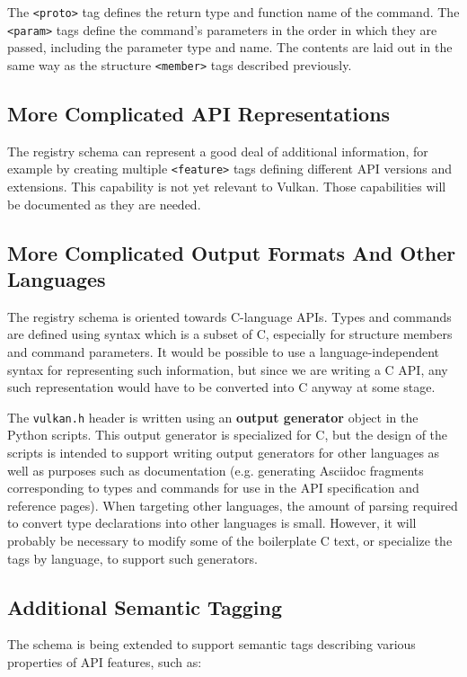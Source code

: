\documentclass{article}
\def\code#1{{\tt #1}}
\def\tag#1{{\tt <#1>\index{<#1>}}}
\begin{document}
The \tag{proto} tag defines the return type and function name of the
command. The \tag{param} tags define the command's parameters in the order
in which they are passed, including the parameter type and name. The contents
are laid out in the same way as the structure \tag{member} tags described
previously.


\subsection{More Complicated API Representations}

The registry schema can represent a good deal of additional information, for
example by creating multiple \tag{feature} tags defining different API
versions and extensions. This capability is not yet relevant to Vulkan.
Those capabilities will be documented as they are needed.


\subsection{More Complicated Output Formats And Other Languages}

The registry schema is oriented towards C-language APIs. Types and commands
are defined using syntax which is a subset of C, especially for structure
members and command parameters. It would be possible to use a
language-independent syntax for representing such information, but since we
are writing a C API, any such representation would have to be converted into
C anyway at some stage.

The \code{vulkan.h} header is written using an {\bf output generator} object
in the Python scripts. This output generator is specialized for C, but the
design of the scripts is intended to support writing output generators for
other languages as well as purposes such as documentation (e.g. generating
Asciidoc fragments corresponding to types and commands for use in the API
specification and reference pages). When targeting other languages, the
amount of parsing required to convert type declarations into other languages
is small. However, it will probably be necessary to modify some of the
boilerplate C text, or specialize the tags by language, to support such
generators.


\subsection{Additional Semantic Tagging}

The schema is being extended to support semantic tags describing
various properties of API features, such as:
\end{document}
